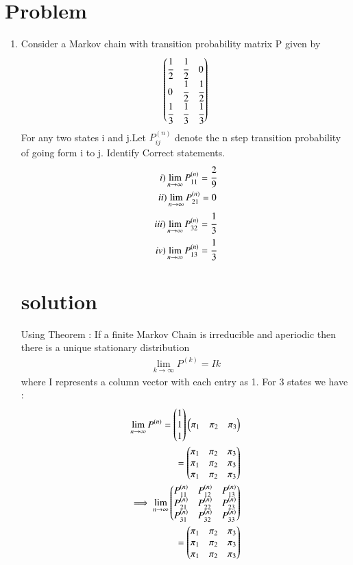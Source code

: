 \section{Problem}
\begin{enumerate}
    \item Consider a Markov chain with transition probability matrix P given by
    \begin{align}
        \begin{pmatrix}\cfrac{1}{2}&\cfrac{1}{2}&0\\0&\cfrac{1}{2}&\cfrac{1}{2}\\\cfrac{1}{3}&\cfrac{1}{3}&\cfrac{1}{3} \end{pmatrix}
    \end{align}
    For any two states i and j.Let $P_{ij}^{(n)}$ denote the n step transition probability of going form i to j. Identify Correct statements.
    \begin{align}
        i)\lim_{n\to\infty} P_{11}^{(n)}=\cfrac{2}{9}
    \\
        ii)\lim_{n\to\infty} P_{21}^{(n)}=0
    \\
        iii)\lim_{n\to\infty} P_{32}^{(n)}=\cfrac{1}{3}
    \\
        iv)\lim_{n\to\infty} P_{13}^{(n)}=\cfrac{1}{3}
    \end{align}
\section{solution}
Using Theorem : If a finite Markov Chain is irreducible and aperiodic then there is a unique stationary distribution
\begin{align}
    \lim_{k\to\infty} P^{(k)}=Ik
\end{align}
where I represents a column vector with each entry as 1. For 3 states we have :
\begin{align}
    \lim_{n\to\infty}P^{(n)}=\begin{pmatrix}1\\1\\1\end{pmatrix}\begin{pmatrix}\pi_{1}&\pi_{2}&\pi_{3}\end{pmatrix}
\\
    =\begin{pmatrix}\pi_{1}&\pi_{2}&\pi_{3}\\\pi_{1}&\pi_{2}&\pi_{3}\\\pi_{1}&\pi_{2}&\pi_{3}\end{pmatrix}
\\
    \implies \lim_{n\to\infty}\begin{pmatrix}P_{11}^{(n)}&P_{12}^{(n)}&P_{13}^{(n)}\\P_{21}^{(n)}&P_{22}^{(n)}&P_{23}^{(n)}\\P_{31}^{(n)}&P_{32}^{(n)}&P_{33}^{(n)}\end{pmatrix}
\\
    =\begin{pmatrix}\pi_{1}&\pi_{2}&\pi_{3}\\\pi_{1}&\pi_{2}&\pi_{3}\\\pi_{1}&\pi_{2}&\pi_{3}\end{pmatrix}
\end{align}


\end{enumerate}

